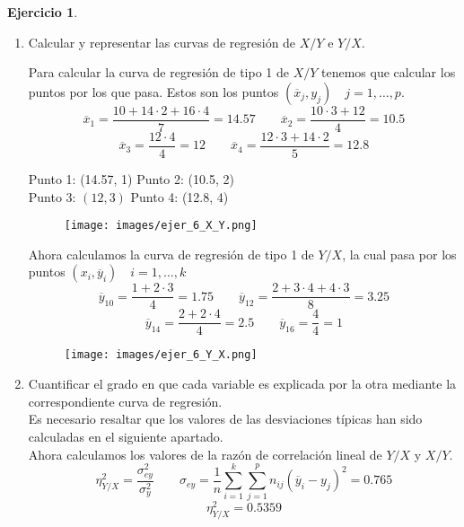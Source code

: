 \documentclass[a4paper, 12pt]{article}
\theoremstyle{definition}
\newtheorem{ej}{Ejercicio}
\begin{document}
\begin{ej}
\begin{enumerate}[label=\alph*)]
	\item Calcular y representar las curvas de regresión de \(X/Y\) e \(Y/X\).
	
	Para calcular la curva de regresión de tipo 1 de \(X/Y\) tenemos que calcular los puntos por los que pasa. Estos son los puntos \((\overline{x}_j, y_j) \quad j=1,\dotsc, p.\)
\[
	\overline{x}_1 = \frac{10 + 14 \cdot 2 + 16 \cdot4}{7} = 14.57 \qquad \overline{x}_2 = \frac{10 \cdot 3 + 12}{4} = 10.5
\]
\[
	\overline{x}_3 = \frac{12 \cdot 4}{4} = 12 \qquad \overline{x}_4 = \frac{12 \cdot 3 + 14 \cdot 2}{5} = 12.8
\]

Punto 1: (14.57, 1) \hspace{1cm} Punto 2: (10.5, 2) \hspace{1cm}  \\

Punto 3: \((12, 3)\) \hspace{1cm} Punto 4: (12.8, 4)


\begin{figure}[h!]
\centering
\texttt{[image: images/ejer\_6\_X\_Y.png]}
\end{figure}

Ahora calculamos la curva de regresión de tipo 1 de \(Y/X\), la cual pasa por los puntos \((x_i, \overline{y}_i) \quad i=1,\dotsc,k\)
\[
	\overline{y}_{10} = \frac{1 + 2 \cdot 3}{4} = 1.75 \qquad \overline{y}_12 = \frac{2 + 3 \cdot 4 + 4 \cdot 3}{8} = 3.25
\]
\[
	\overline{y}_{14} = \frac{2 + 2 \cdot 4}{4} = 2.5 \qquad \overline{y}_{16} = \frac{4}{4} = 1
\]

\newpage

\begin{figure}[h!]
\centering
\texttt{[image: images/ejer\_6\_Y\_X.png]}
\end{figure}

	\item Cuantificar el grado en que cada variable es explicada por la otra mediante la correspondiente curva de regresión. \\
	
	Es necesario resaltar que los valores de las desviaciones típicas han sido calculadas en el siguiente apartado. \\
	
	Ahora calculamos los valores de la razón de correlación lineal de \(Y/X\) y \(X/Y\).
\[
    \eta_{Y/X}^{2} = \frac{\sigma_{ey}^2}{\sigma_y^2} \qquad \sigma_{ey} = \frac{1}{n} \sum_{i=1}^{k} \sum_{j=1}^{p} n_{ij} (\overline{y}_i - y_j)^2 = 0.765
\]
\[
	\eta_{Y/X}^2 = 0.5359
\]


\end{enumerate}
\end{ej}
\end{document}
